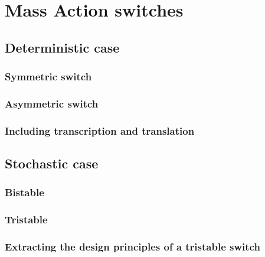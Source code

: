 \section{Mass Action switches}
\subsection{Deterministic case}
\subsubsection{Symmetric switch}
\subsubsection{Asymmetric switch}
\subsubsection{Including transcription and translation}
\subsection{Stochastic case}
\subsubsection{Bistable} 
\subsubsection{Tristable}
\subsubsection{Extracting the design principles of a tristable switch}
